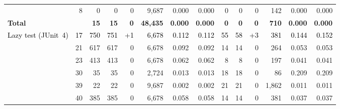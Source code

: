 \begin{xltabular}{\linewidth}{l r r r r r r r r r r r r r}
     & \textcolor{muted}{8} & \textcolor{muted}{0} & \textcolor{muted}{0} & \textcolor{muted}{0} & \textcolor{muted}{9,687} & \textcolor{muted}{0.000} & \textcolor{muted}{0.000} & \textcolor{muted}{0} & \textcolor{muted}{0} & \textcolor{muted}{0} & \textcolor{muted}{142} & \textcolor{muted}{0.000} & \textcolor{muted}{0.000} \\
    \textbf{Total} & & \textbf{15} & \textbf{15} & \textbf{0} & \textbf{48,435} & \textbf{0.000} & \textbf{0.000} & \textbf{0} & \textbf{0} & \textbf{0} & \textbf{710} & \textbf{0.000} & \textbf{0.000} \\
  \midrule
    \textcolor{black}{Lazy test (JUnit~4)} & \textcolor{black}{17} & \textcolor{black}{750} & \textcolor{black}{751} & \textcolor{black}{+1} & \textcolor{black}{6,678} & \textcolor{black}{0.112} & \textcolor{black}{0.112} & \textcolor{black}{55} & \textcolor{black}{58} & \textcolor{black}{+3} & \textcolor{black}{381} & \textcolor{black}{0.144} & \textcolor{black}{0.152} \\
     & \textcolor{muted}{21} & \textcolor{muted}{617} & \textcolor{muted}{617} & \textcolor{muted}{0} & \textcolor{muted}{6,678} & \textcolor{muted}{0.092} & \textcolor{muted}{0.092} & \textcolor{muted}{14} & \textcolor{muted}{14} & \textcolor{muted}{0} & \textcolor{muted}{264} & \textcolor{muted}{0.053} & \textcolor{muted}{0.053} \\
     & \textcolor{muted}{23} & \textcolor{muted}{413} & \textcolor{muted}{413} & \textcolor{muted}{0} & \textcolor{muted}{6,678} & \textcolor{muted}{0.062} & \textcolor{muted}{0.062} & \textcolor{muted}{8} & \textcolor{muted}{8} & \textcolor{muted}{0} & \textcolor{muted}{197} & \textcolor{muted}{0.041} & \textcolor{muted}{0.041} \\
     & \textcolor{muted}{30} & \textcolor{muted}{35} & \textcolor{muted}{35} & \textcolor{muted}{0} & \textcolor{muted}{2,724} & \textcolor{muted}{0.013} & \textcolor{muted}{0.013} & \textcolor{muted}{18} & \textcolor{muted}{18} & \textcolor{muted}{0} & \textcolor{muted}{86} & \textcolor{muted}{0.209} & \textcolor{muted}{0.209} \\
     & \textcolor{muted}{39} & \textcolor{muted}{22} & \textcolor{muted}{22} & \textcolor{muted}{0} & \textcolor{muted}{9,687} & \textcolor{muted}{0.002} & \textcolor{muted}{0.002} & \textcolor{muted}{21} & \textcolor{muted}{21} & \textcolor{muted}{0} & \textcolor{muted}{1,862} & \textcolor{muted}{0.011} & \textcolor{muted}{0.011} \\
     & \textcolor{muted}{40} & \textcolor{muted}{385} & \textcolor{muted}{385} & \textcolor{muted}{0} & \textcolor{muted}{6,678} & \textcolor{muted}{0.058} & \textcolor{muted}{0.058} & \textcolor{muted}{14} & \textcolor{muted}{14} & \textcolor{muted}{0} & \textcolor{muted}{381} & \textcolor{muted}{0.037} & \textcolor{muted}{0.037} \\

\end{xltabular}
